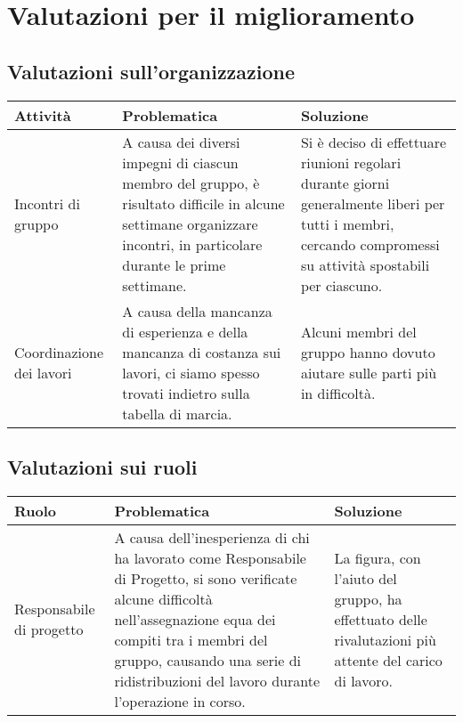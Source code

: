 \chapter{Valutazioni per il miglioramento}\label{valutazioni-per-il-miglioramento}

\section{Valutazioni sull'organizzazione}
\begin{center}
    \begin{xltabular}{\linewidth}{|l|X|X|}
    \hline
    \textbf{Attività} & \textbf{Problematica} & \textbf{Soluzione} \\
    \hline
     Incontri di gruppo & A causa dei diversi impegni di ciascun membro del gruppo, è risultato difficile in alcune settimane organizzare incontri, in particolare durante le prime settimane. & Si è deciso di effettuare riunioni regolari durante giorni generalmente liberi per tutti i membri, cercando compromessi su attività spostabili per ciascuno.\\   
     \hline  
     Coordinazione dei lavori & A causa della mancanza di esperienza e della mancanza di costanza sui lavori, ci siamo spesso trovati indietro sulla tabella di marcia. & Alcuni membri del gruppo hanno dovuto aiutare sulle parti più in difficoltà. \\ 
     \hline
    \end{xltabular}
\end{center}

\section{Valutazioni sui ruoli}
\begin{center}
    \begin{xltabular}{\linewidth}{|l|X|X|}
    \hline
    \textbf{Ruolo} & \textbf{Problematica} & \textbf{Soluzione} \\
    \hline
    Responsabile di progetto & A causa dell'inesperienza di chi ha lavorato come Responsabile di Progetto, si sono verificate alcune difficoltà nell'assegnazione equa dei compiti tra i membri del gruppo, causando una serie di ridistribuzioni del lavoro durante l'operazione in corso. & La figura, con l'aiuto del gruppo, ha effettuato delle rivalutazioni più attente del carico di lavoro. \\
     \hline

    \hline

   \end{xltabular}
\end{center}

